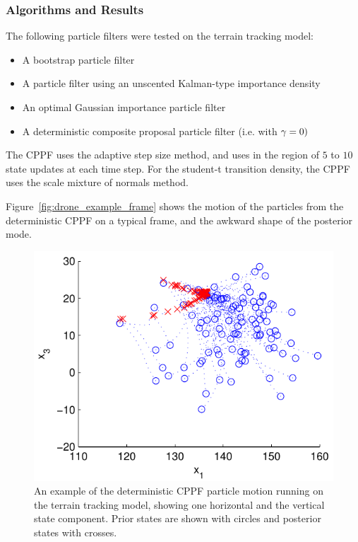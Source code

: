 \documentclass{article}
\begin{document}
\subsubsection{Algorithms and Results}

The following particle filters were tested on the terrain tracking model:
\begin{itemize}
  \item A bootstrap particle filter
  \item A particle filter using an unscented Kalman-type importance density
  \item An optimal Gaussian importance particle filter
  \item A deterministic composite proposal particle filter (i.e. with $\gamma=0)$
\end{itemize}

The CPPF uses the adaptive step size method, and uses in the region of $5$ to $10$ state updates at each time step. For the student-t transition density, the CPPF uses the scale mixture of normals method.

Figure~\ref{fig:drone_example_frame} shows the motion of the particles from the deterministic CPPF on a typical frame, and the awkward shape of the posterior mode.
%
\begin{figure}
\centering
\includegraphics[width=0.7\columnwidth]{drone_example_frame_deter.pdf}
\caption{An example of the deterministic CPPF particle motion running on the terrain tracking model, showing one horizontal and the vertical state component. Prior states are shown with circles and posterior states with crosses.}
\label{fig:drone_example_frame_deterministic}
\end{figure}
\end{document}
